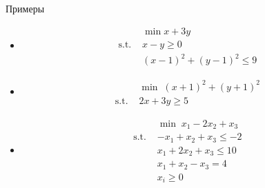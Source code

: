 \documentclass[12pt]{beamer}
\begin{document}
\begin{frame}{Примеры}
\begin{itemize}
\item 
\begin{equation*}
\begin{split}
& \min x + 3y\\
\text{s.t. } & x - y \geq 0\\
& (x - 1)^2 + (y - 1)^2 \leq 9
\end{split}
\end{equation*}
\item 
\begin{equation*}
\begin{split}
& \min \; (x+ 1)^2 + (y + 1)^2\\
\text{s.t. } & 2x + 3y \geq 5
\end{split}
\end{equation*}
\item 
\begin{equation*}
\begin{split}
& \min \; x_1 - 2x_2 + x_3\\
\text{s.t. } & -x_1 + x_2 + x_3 \leq -2\\
& x_1 + 2x_2 + x_3 \leq 10\\
& x_1 + x_2 - x_3 = 4\\
& x_i \geq 0
\end{split}
\end{equation*}

\end{itemize}
\end{frame}
\end{document}
